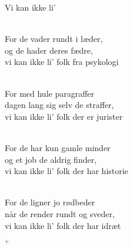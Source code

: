 \begin{song}{Vi kan ikke li'}
 \begin{SBVerse}
    \\
    For de vader rundt i læder,\\
    og de hader deres fædre,\\
    vi kan ikke li' folk fra psykologi
  \end{SBVerse}

 \begin{SBVerse}
    \\
    For med hule paragraffer\\
    dagen lang sig selv de straffer,\\
    vi kan ikke li' folk der er jurister
  \end{SBVerse}

 \begin{SBVerse}
    \\
    For de har kun gamle minder\\
    og et job de aldrig finder,\\
    vi kan ikke li' folk der har historie
  \end{SBVerse}

 \begin{SBVerse}
    \\
    For de ligner jo rødbeder\\
    når de render rundt og sveder,\\
    vi kan ikke li' folk der har idræt
  \end{SBVerse}

 \begin{SBVerse}
    $^+$
  \end{SBVerse}
\end{song}